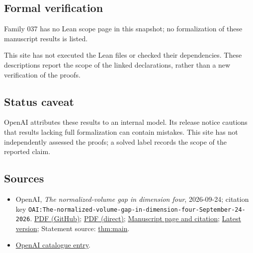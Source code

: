 \documentclass[11pt]{article}
\begin{document}
\subsection{Formal verification}
Family 037 has no Lean scope page in this snapshot; no formalization of these manuscript results is listed.

This site has not executed the Lean files or checked their dependencies. These descriptions report the scope of the linked declarations, rather than a new verification of the proofs.

\subsection{Status caveat}
OpenAI attributes these results to an internal model. Its release notice cautions that results lacking full formalization can contain mistakes. This site has not independently assessed the proofs; a solved label records the scope of the reported claim.

\subsection{Sources}
\begin{itemize}
\item OpenAI, \emph{The normalized-volume gap in dimension four}, 2026-09-24; citation key \texttt{OAI:The-normalized-volume-gap-in-dimension-four-September-24-2026}. \href{https://github.com/openai/math/blob/adc7f1241b42e322a6451854ab7e4b4c146bf78a/preprints/The-normalized-volume-gap-in-dimension-four-September-24-2026/paper.pdf}{PDF (GitHub)}; \href{https://github.com/openai/math/raw/adc7f1241b42e322a6451854ab7e4b4c146bf78a/preprints/The-normalized-volume-gap-in-dimension-four-September-24-2026/paper.pdf}{PDF (direct)}; \href{https://github.com/openai/math/blob/adc7f1241b42e322a6451854ab7e4b4c146bf78a/preprints/The-normalized-volume-gap-in-dimension-four-September-24-2026/README.md}{Manuscript page and citation}; \href{https://github.com/openai/math/blob/main/preprints/The-normalized-volume-gap-in-dimension-four-September-24-2026/paper.pdf}{Latest version}; Statement source: \href{https://github.com/openai/math/blob/adc7f1241b42e322a6451854ab7e4b4c146bf78a/preprints/The-normalized-volume-gap-in-dimension-four-September-24-2026/build/paper.tex\#L74}{thm:main}.
\item \href{https://github.com/openai/math/blob/adc7f1241b42e322a6451854ab7e4b4c146bf78a/CONTENTS.md}{OpenAI catalogue entry}.
\end{itemize}
\end{document}

